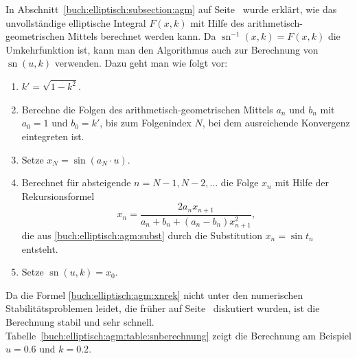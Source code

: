 In Abschnitt~\ref{buch:elliptisch:subsection:agm} auf
Seite~\pageref{buch:elliptisch:subsubection:berechnung-fxk-agm}
wurde erklärt, wie das unvollständige elliptische Integral $F(x,k)$ mit 
Hilfe des arithmetisch-geometrischen Mittels berechnet werden kann.
Da $\operatorname{sn}^{-1}(x,k) = F(x,k)$ die Umkehrfunktion ist, kann
man den Algorithmus auch zur Berechnung von $\operatorname{sn}(u,k)$ 
verwenden.
Dazu geht man wie folgt vor:
\begin{enumerate}
\item
$k'=\sqrt{1-k^2}$.
\item
Berechne die Folgen des arithmetisch-geometrischen Mittels
$a_n$ und $b_n$ mit $a_0=1$ und $b_0=k'$, bis zum Folgenindex $N$,
bei dem ausreichende Konvergenz eintegreten ist.
\item
Setze $x_N = \sin(a_N \cdot u)$.
\item
Berechnet für absteigende $n=N-1,N-2,\dots$ die Folge $x_n$ mit Hilfe
der Rekursionsformel
\begin{equation}
x_{n}
=
\frac{2a_nx_{n+1}}{a_n+b_n+(a_n-b_n)x_{n+1}^2},
\label{buch:elliptisch:agm:xnrek}
\end{equation}
die aus \eqref{buch:elliptisch:agm:subst}
durch die Substitution $x_n = \sin t_n$ entsteht.
\item
Setze $\operatorname{sn}(u,k) = x_0$.
\end{enumerate}
Da die Formel \eqref{buch:elliptisch:agm:xnrek} nicht unter den
numerischen Stabilitätsproblemen leidet, die früher auf
Seite~\pageref{buch:elliptisch:agm:ellintegral-stabilitaet}
diskutiert wurden, ist die Berechnung stabil und sehr schnell.
Tabelle~\ref{buch:elliptisch:agm:table:snberechnung}
zeigt die Berechnung am Beispiel $u=0.6$ und $k=0.2$.

%
%
